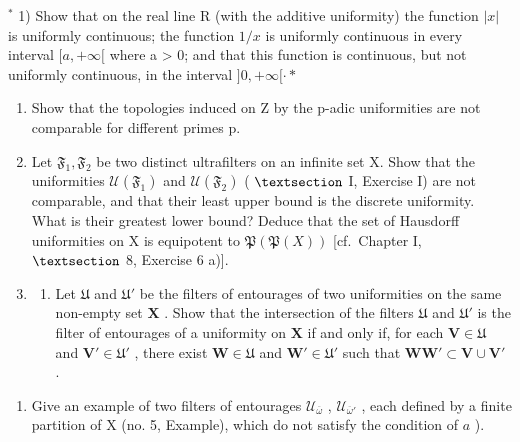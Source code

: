 \BourbakiExerciseGroup

\(^{*}\) 1) Show that on the real line R (with the additive uniformity) the function \(|x|\) is uniformly continuous; the function \(1/x\) is uniformly continuous in every interval \([a, +\infty[\) where a \textgreater{} 0; and that this function is continuous, but not uniformly continuous, in the interval \(]0, +\infty[\cdot*\)

\begin{enumerate}
\def\labelenumi{\arabic{enumi})}
\setcounter{enumi}{1}
\item
  Show that the topologies induced on Z by the p-adic uniformities are not comparable for different primes p.
\item
  Let \(\mathfrak{F}_1, \mathfrak{F}_2\) be two distinct ultrafilters on an infinite set X. Show that the uniformities \(\mathcal{U}(\mathfrak{F}_1)\) and \(\mathcal{U}(\mathfrak{F}_2)\) ( \(\S\) I, Exercise I) are not comparable, and that their least upper bound is the discrete uniformity. What is their greatest lower bound? Deduce that the set of Hausdorff uniformities on X is equipotent to \(\mathfrak{P}(\mathfrak{P}(X))\) {[}cf.~Chapter I, \(\S\) 8, Exercise 6 a){]}.
\item
  \begin{enumerate}
  \def\labelenumii{\alph{enumii})}
  \tightlist
  \item
    Let \(\mathfrak{U}\) and \(\mathfrak{U}'\) be the filters of entourages of two uniformities on the same non-empty set \(\mathbf{X}\) . Show that the intersection of the filters \(\mathfrak{U}\) and \(\mathfrak{U}'\) is the filter of entourages of a uniformity on \(\mathbf{X}\) if and only if, for each \(\mathbf{V} \in \mathfrak{U}\) and \(\mathbf{V}' \in \mathfrak{U}'\) , there exist \(\mathbf{W} \in \mathfrak{U}\) and \(\mathbf{W}' \in \mathfrak{U}'\) such that \(\mathbf{WW}' \subset \mathbf{V} \cup \mathbf{V}'\) .
  \end{enumerate}
\end{enumerate}

\begin{enumerate}
\def\labelenumi{\alph{enumi})}
\setcounter{enumi}{1}
\tightlist
\item
  Give an example of two filters of entourages \(\mathcal{U}_{\overline{\omega}}\) , \(\mathcal{U}_{\overline{\omega}'}\) , each defined by a finite partition of X (no. 5, Example), which do not satisfy the condition of \(a\) ).
\end{enumerate}


